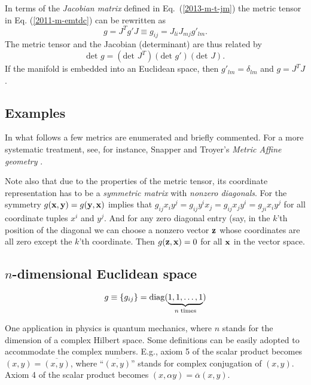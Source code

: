 In terms of the
{\em  Jacobian matrix} defined in Eq.~(\ref{2013-m-t-jm})
the metric tensor in Eq. (\ref{2011-m-emtdc})
can be rewritten as
\begin{equation}
g = J^T g' J
\equiv g_{ij}= J_{li}J_{mj}g'_{lm}
.
\label{2011-m-emtdcJ}
\end{equation}
The metric tensor and the Jacobian (determinant)
are thus related by
\begin{equation}
\textrm{det }g = (\textrm{det }J^T) (\textrm{det } g')(\textrm{det } J)
.
\label{2011-m-emtdcJd}
\end{equation}
If the manifold is embedded into an Euclidean space,
then $g'_{lm}=\delta_{lm}$
and  $g = J^T  J $.

\subsection{Examples}

In what follows a few metrics are enumerated and briefly commented.
For a more systematic treatment, see, for instance, Snapper and Troyer's {\em Metric Affine geometry} \cite{snapper-troyer}.

Note also that due to the properties of the metric tensor, its coordinate representation has to be a {\em symmetric matrix}
with {\em nonzero diagonals}.
For the symmetry $g( {\bf x}  ,{\bf y} )=g({\bf y} ,{\bf x} )$ implies that $g_{ij}x_iy^j= g_{ij}y^ix_j=  g_{ij}x_jy^i= g_{ji}x_iy^j$ for all coordinate tuples
$x^i$ and $y^j$. And for any zero diagonal entry (say, in the $k$'th position of the diagonal we can choose a nonzero vector  ${\bf z}$
whose coordinates are all zero except the $k$'th coordinate. Then $g ({\bf z},{\bf x})=0$ for all ${\bf x}$ in the vector space.


\subsection*{$n$-dimensional Euclidean space}

\begin{equation}
g\equiv \{g_{ij}\}={\rm diag} (\underbrace{1,1,\ldots ,1}_{n\; {\rm times}})
\end{equation}

One application in physics is quantum mechanics,
where $n$ stands for the dimension of a complex Hilbert space.
Some definitions can be easily adopted to accommodate the complex numbers.
E.g., axiom 5 of the scalar product becomes
$(x,y)=\overline{(x,y)}$, where ``$\overline{(x,y)}$'' stands for complex conjugation of $(x,y)$.
Axiom 4 of the scalar product becomes
$(x,\alpha y)=\overline{\alpha} (x,y)$.

